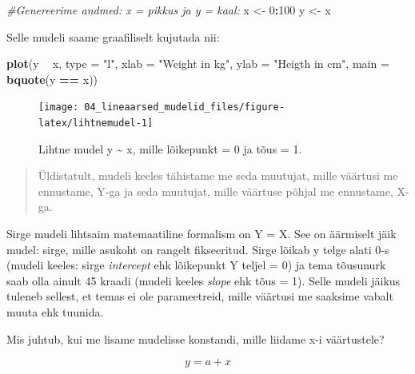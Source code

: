\documentclass[]{book}
\newenvironment{Shaded}{\begin{snugshade}}{\end{snugshade}}
\newcommand{\CommentTok}[1]{\textcolor[rgb]{0.56,0.35,0.01}{\textit{#1}}}
\newcommand{\DataTypeTok}[1]{\textcolor[rgb]{0.13,0.29,0.53}{#1}}
\newcommand{\DecValTok}[1]{\textcolor[rgb]{0.00,0.00,0.81}{#1}}
\newcommand{\KeywordTok}[1]{\textcolor[rgb]{0.13,0.29,0.53}{\textbf{#1}}}
\newcommand{\NormalTok}[1]{#1}
\newcommand{\OperatorTok}[1]{\textcolor[rgb]{0.81,0.36,0.00}{\textbf{#1}}}
\newcommand{\StringTok}[1]{\textcolor[rgb]{0.31,0.60,0.02}{#1}}
\begin{document}
\begin{Shaded}
\begin{Highlighting}[]
\CommentTok{#Genereerime andmed: x = pikkus ja y = kaal:}
\NormalTok{x <-}\StringTok{ }\DecValTok{0}\OperatorTok{:}\DecValTok{100}
\NormalTok{y <-}\StringTok{ }\NormalTok{x}
\end{Highlighting}
\end{Shaded}

Selle mudeli saame graafiliselt kujutada nii:



\begin{Shaded}
\begin{Highlighting}[]
\KeywordTok{plot}\NormalTok{(y }\OperatorTok{~}\StringTok{ }\NormalTok{x, }
     \DataTypeTok{type =} \StringTok{"l"}\NormalTok{, }
     \DataTypeTok{xlab =} \StringTok{"Weight in kg"}\NormalTok{, }
     \DataTypeTok{ylab =} \StringTok{"Heigth in cm"}\NormalTok{, }
     \DataTypeTok{main =} \KeywordTok{bquote}\NormalTok{(y }\OperatorTok{==}\StringTok{ }\NormalTok{x))}
\end{Highlighting}
\end{Shaded}

\begin{figure}

{\centering \texttt{[image: 04\_lineaarsed\_mudelid\_files/figure-latex/lihtnemudel-1]} 

}

\caption{Lihtne mudel y \textasciitilde{} x, mille lõikepunkt = 0 ja tõus = 1.}\label{fig:lihtnemudel}
\end{figure}

\begin{quote}
Üldistatult, mudeli keeles tähistame me seda muutujat, mille väärtusi me ennustame, Y-ga ja seda muutujat, mille väärtuse põhjal me ennustame, X-ga.
\end{quote}

Sirge mudeli lihtsaim matemaatiline formalism on Y = X.
See on äärmiselt jäik mudel: sirge, mille asukoht on rangelt fikseeritud.
Sirge lõikab y telge alati 0-s (mudeli keeles: sirge \emph{intercept} ehk lõikepunkt Y teljel = 0) ja tema tõusunurk saab olla ainult 45 kraadi (mudeli keeles \emph{slope} ehk tõus = 1).
Selle mudeli jäikus tuleneb sellest, et temas ei ole parameetreid, mille väärtusi me saaksime vabalt muuta ehk tuunida.

Mis juhtub, kui me lisame mudelisse konstandi, mille liidame x-i väärtustele?

\[y = a + x\]
\end{document}
